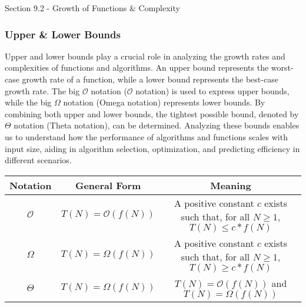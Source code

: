 \begin{notes}{Section 9.2 - Growth of Functions \& Complexity}
    \subsubsection*{Upper \& Lower Bounds}

    Upper and lower bounds play a crucial role in analyzing the growth rates and complexities of functions and algorithms. An upper bound represents the worst-case growth rate of a function, while a lower bound represents the best-case growth rate. The big $\mathcal{O}$ notation ($\mathcal{O}$ notation) is used to express upper bounds, while the big $\Omega$ notation (Omega notation) represents 
    lower bounds. By combining both upper and lower bounds, the tightest possible bound, denoted by $\Theta$ notation (Theta notation), can be determined. Analyzing these bounds enables us to understand how the performance of algorithms and functions scales with input size, aiding in algorithm selection, optimization, and predicting efficiency in different scenarios.
    
    \begin{center}
        \begin{tabular}{|c|c|c|}
            \hline Notation & General Form & Meaning \\ \hline
            $\mathcal{O}$ & $T(N)=\mathcal{O}(f(N))$ & A positive constant $c$ exists such that, for all $N \geq 1$, $T(N) \leq c * f(N)$ \\ \hline
            $\Omega$ & $T(N)=\Omega(f(N))$ & A positive constant $c$ exists such that, for all $N \geq 1$, $T(N) \geq c * f(N)$ \\ \hline
            $\Theta$ & $T(N)=\Omega(f(N))$ & $T(N)=\mathcal{O}(f(N))$ and $T(N)=\Omega(f(N))$ \\ \hline
        \end{tabular}
    \end{center}
\end{notes}


